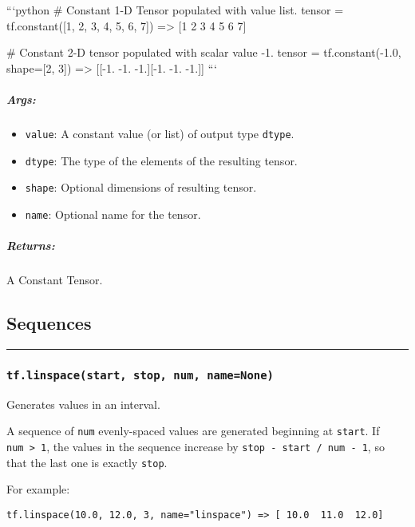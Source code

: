 ```python \# Constant 1-D Tensor populated with value list. tensor =
tf.constant({[}1, 2, 3, 4, 5, 6, 7{]}) =\textgreater{} {[}1 2 3 4 5 6
7{]}

\# Constant 2-D tensor populated with scalar value -1. tensor =
tf.constant(-1.0, shape={[}2, 3{]}) =\textgreater{} {[}{[}-1. -1.
-1.{]}{[}-1. -1. -1.{]}{]} ```

\subparagraph{Args: }\label{args-5}

\begin{itemize}
\item
  \texttt{value}: A constant value (or list) of output type
  \texttt{dtype}.
\item
  \texttt{dtype}: The type of the elements of the resulting tensor.
\item
  \texttt{shape}: Optional dimensions of resulting tensor.
\item
  \texttt{name}: Optional name for the tensor.
\end{itemize}

\subparagraph{Returns: }\label{returns-5}

A Constant Tensor.

\subsection{Sequences }\label{sequences}

\begin{center}\rule{0.5\linewidth}{\linethickness}\end{center}

\subsubsection{\texorpdfstring{\texttt{tf.linspace(start,\ stop,\ num,\ name=None)}
}{tf.linspace(start, stop, num, name=None) }}\label{tf.linspacestart-stop-num-namenone}

Generates values in an interval.

A sequence of \texttt{num} evenly-spaced values are generated beginning
at \texttt{start}. If \texttt{num\ \textgreater{}\ 1}, the values in the
sequence increase by \texttt{stop\ -\ start\ /\ num\ -\ 1}, so that the
last one is exactly \texttt{stop}.

For example:

\begin{verbatim}
tf.linspace(10.0, 12.0, 3, name="linspace") => [ 10.0  11.0  12.0]
\end{verbatim}

